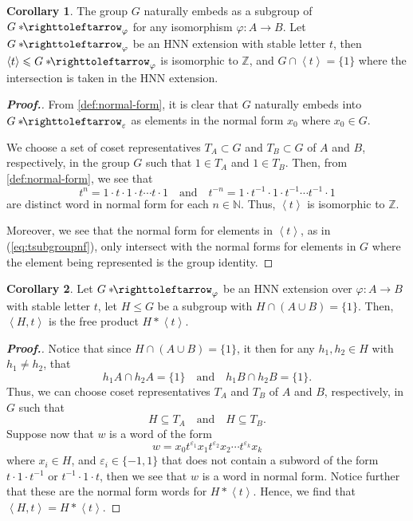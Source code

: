 \documentclass[11pt,a4paper,reqno]{amsart}
\theoremstyle{plain}
\theoremstyle{definition}
\newtheorem{corollary}{Corollary}[theorem]
\theoremstyle{definition}
\renewcommand\leq\leqslant
\newenvironment{myproof}{\begin{proof}[\normalfont\bfseries Proof.]}{\end{proof}}
\newcommand\hnn{*\!\!\righttoleftarrow}
\begin{document}
\begin{corollary}\label{lem:stable-letter-subgroup}
	The group $G$ naturally embeds as a subgroup of $G\hnn_\varphi$ for any isomorphism $\varphi \colon A\to B$.
	Let $G\hnn_\varphi$ be an HNN extension with stable letter $t$, then $\left\langle t\right\rangle\leq G\hnn_\varphi$ is isomorphic to $\mathbb Z$, and $G \cap \left\langle t \right\rangle = \{1\}$ where the intersection is taken in the HNN extension.
\end{corollary}
\begin{myproof}
	From \cref{def:normal-form}, it is clear that $G$ naturally embeds into $G\hnn_\varepsilon$ as elements in the normal form $x_0$ where $x_0 \in G$.

	We choose a set of coset representatives $T_A\subset G$ and $T_B\subset G$ of $A$ and $B$, respectively, in the group $G$ such that $1\in T_A$ and $1\in T_B$.
	Then, from \cref{def:normal-form}, we see that
  \begin{equation}\label{eq:tsubgroupnf}
		t^{n} = 1 \cdot t \cdot 1 \cdot t \cdots t \cdot 1
		\quad\text{and}\quad
		t^{-n} = 1 \cdot t^{-1} \cdot 1 \cdot t^{-1} \cdots t^{-1} \cdot 1
  \end{equation}are distinct word in normal form for each $n \in \mathbb N$.
	Thus, $\left\langle t \right\rangle$ is isomorphic to $\mathbb Z$.

  Moreover, we see that the normal form for elements in $\left\langle t \right\rangle$, as in (\ref{eq:tsubgroupnf}), only intersect with the normal forms for elements in $G$ where the element being represented is the group identity.
\end{myproof}

\begin{corollary}\label{lem:free-subgroup}
	Let $G\hnn_\varphi$ be an HNN extension over $\varphi\colon A\to B$ with stable letter $t$,
	let $H \leq G$ be a subgroup with $H\cap (A\cup B)=\{1\}$.
	Then, $\left\langle H,t \right\rangle$ is the free product $H * \left\langle t\right\rangle$.
\end{corollary}
\begin{myproof}
  Notice that since $H \cap (A\cup B) = \{1\}$, it then for any $h_1,h_2 \in H$ with $h_1\neq h_2$, that
	\[
		h_1 A \cap h_2 A = \{1\}
		\quad
		\text{and}
		\quad
		h_1 B \cap h_2 B = \{1\}.
	\]
	Thus, we can choose coset representatives $T_A$ and $T_B$ of $A$ and $B$, respectively, in $G$ such that
	\[
		H \subseteq T_A
		\quad
		\text{and}
		\quad
		H \subseteq T_B.
	\]
	Suppose now that $w$ is a word of the form
	\[
    w=
		x_0 t^{\varepsilon_1} x_1 t^{\varepsilon_2} x_2 \cdots t^{\varepsilon_k} x_k
	\]
  where $x_i\in H$, and $\varepsilon_i\in \{-1,1\}$ that does not contain a subword of the form $t\cdot 1\cdot t^{-1}$ or $t^{-1}\cdot 1\cdot t$, then we see that $w$ is a word in normal form.
	Notice further that these are the normal form words for $H*\left\langle t\right\rangle$.
	Hence, we find that $\left\langle H,t \right\rangle = H*\left\langle t\right\rangle$.
\end{myproof}
\end{document}
